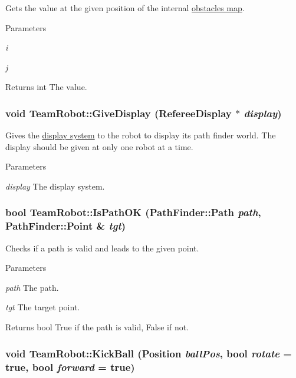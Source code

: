 Gets the value at the given position of the internal \hyperlink{classInterpreter_a4c080f069f557cf92dfe803117a6ea53}{obstacles map}. 


\begin{DoxyParams}{Parameters}
\item[{\em i}]\item[{\em j}]\end{DoxyParams}
\begin{DoxyReturn}{Returns}
int The value. 
\end{DoxyReturn}
\hypertarget{classTeamRobot_a2caa2411b9972fa5caa595f568394ba0}{
\subsubsection[{GiveDisplay}]{\setlength{\rightskip}{0pt plus 5cm}void TeamRobot::GiveDisplay ({\bf RefereeDisplay} $\ast$ {\em display})}}
\label{classTeamRobot_a2caa2411b9972fa5caa595f568394ba0}


Gives the \hyperlink{classRefereeDisplay}{display system} to the robot to display its path finder world. The display should be given at only one robot at a time. 


\begin{DoxyParams}{Parameters}
\item[{\em display}]The display system. \end{DoxyParams}
\hypertarget{classTeamRobot_afb5f9191ca185053af37c1ae1f8dcb17}{
\subsubsection[{IsPathOK}]{\setlength{\rightskip}{0pt plus 5cm}bool TeamRobot::IsPathOK ({\bf PathFinder::Path} {\em path}, \/  {\bf PathFinder::Point} \& {\em tgt})}}
\label{classTeamRobot_afb5f9191ca185053af37c1ae1f8dcb17}


Checks if a path is valid and leads to the given point. 


\begin{DoxyParams}{Parameters}
\item[{\em path}]The path. \item[{\em tgt}]The target point. \end{DoxyParams}
\begin{DoxyReturn}{Returns}
bool True if the path is valid, False if not. 
\end{DoxyReturn}
\hypertarget{classTeamRobot_a36d006bfeadfcdd37bd1eeb47223bdba}{
\subsubsection[{KickBall}]{\setlength{\rightskip}{0pt plus 5cm}void TeamRobot::KickBall (Position {\em ballPos}, \/  bool {\em rotate} = {\ttfamily true}, \/  bool {\em forward} = {\ttfamily true})}}
\label{classTeamRobot_a36d006bfeadfcdd37bd1eeb47223bdba}


